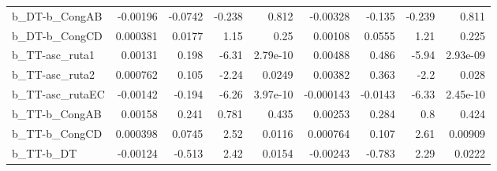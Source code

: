 \begin{tabular}{lrrrrrrrr}
b\_DT-b\_CongAB        &    -0.00196 &      -0.0742 &  -0.238 &    0.812 &   -0.00328 &      -0.135 &       -0.239 &         0.811 \\
b\_DT-b\_CongCD        &    0.000381 &       0.0177 &    1.15 &     0.25 &    0.00108 &      0.0555 &         1.21 &         0.225 \\
b\_TT-asc\_ruta1       &     0.00131 &        0.198 &   -6.31 & 2.79e-10 &    0.00488 &       0.486 &        -5.94 &      2.93e-09 \\
b\_TT-asc\_ruta2       &    0.000762 &        0.105 &   -2.24 &   0.0249 &    0.00382 &       0.363 &         -2.2 &         0.028 \\
b\_TT-asc\_rutaEC      &    -0.00142 &       -0.194 &   -6.26 & 3.97e-10 &  -0.000143 &     -0.0143 &        -6.33 &      2.45e-10 \\
b\_TT-b\_CongAB        &     0.00158 &        0.241 &   0.781 &    0.435 &    0.00253 &       0.284 &          0.8 &         0.424 \\
b\_TT-b\_CongCD        &    0.000398 &       0.0745 &    2.52 &   0.0116 &   0.000764 &       0.107 &         2.61 &       0.00909 \\
b\_TT-b\_DT            &    -0.00124 &       -0.513 &    2.42 &   0.0154 &   -0.00243 &      -0.783 &         2.29 &        0.0222 \\
\bottomrule
\end{tabular}
